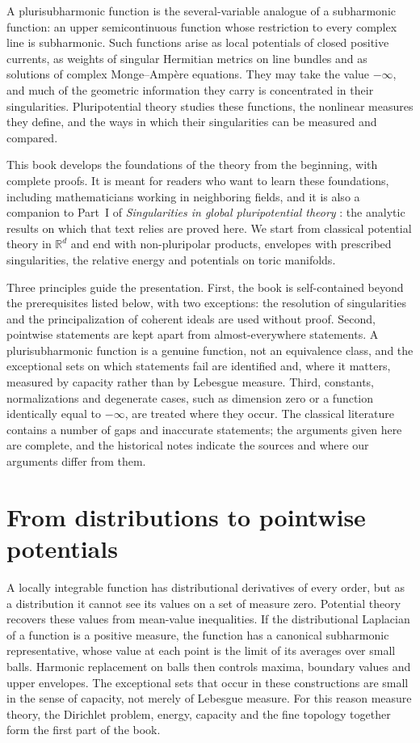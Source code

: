 \preface[Introduction]
\label{intro:book}

A plurisubharmonic function is the several-variable analogue of a subharmonic function: an upper semicontinuous function whose restriction to every complex line is subharmonic. Such functions arise as local potentials of closed positive currents, as weights of singular Hermitian metrics on line bundles and as solutions of complex Monge--Amp\`ere equations. They may take the value $-\infty$, and much of the geometric information they carry is concentrated in their singularities. Pluripotential theory studies these functions, the nonlinear measures they define, and the ways in which their singularities can be measured and compared.

This book develops the foundations of the theory from the beginning, with complete proofs. It is meant for readers who want to learn these foundations, including mathematicians working in neighboring fields, and it is also a companion to Part~I of \emph{Singularities in global pluripotential theory} \cite{XiaSampleBook}: the analytic results on which that text relies are proved here. We start from classical potential theory in $\mathbb R^d$ and end with non-pluripolar products, envelopes with prescribed singularities, the relative energy and potentials on toric manifolds.

Three principles guide the presentation. First, the book is self-contained beyond the prerequisites listed below, with two exceptions: the resolution of singularities and the principalization of coherent ideals are used without proof. Second, pointwise statements are kept apart from almost-everywhere statements. A plurisubharmonic function is a genuine function, not an equivalence class, and the exceptional sets on which statements fail are identified and, where it matters, measured by capacity rather than by Lebesgue measure. Third, constants, normalizations and degenerate cases, such as dimension zero or a function identically equal to $-\infty$, are treated where they occur. The classical literature contains a number of gaps and inaccurate statements; the arguments given here are complete, and the historical notes indicate the sources and where our arguments differ from them.

\section*{From distributions to pointwise potentials}
A locally integrable function has distributional derivatives of every order, but as a distribution it cannot see its values on a set of measure zero. Potential theory recovers these values from mean-value inequalities. If the distributional Laplacian of a function is a positive measure, the function has a canonical subharmonic representative, whose value at each point is the limit of its averages over small balls. Harmonic replacement on balls then controls maxima, boundary values and upper envelopes. The exceptional sets that occur in these constructions are small in the sense of capacity, not merely of Lebesgue measure. For this reason measure theory, the Dirichlet problem, energy, capacity and the fine topology together form the first part of the book.


